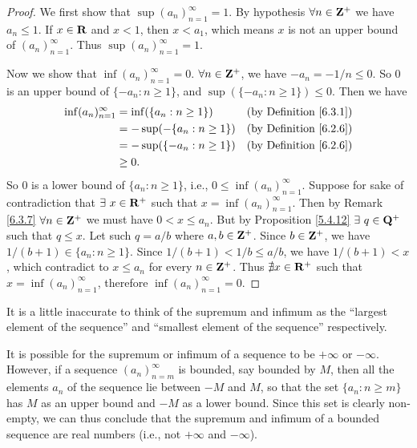 \begin{proof}
    We first show that \(\sup(a_n)_{n = 1}^\infty = 1\).
    By hypothesis \(\forall n \in \mathbf{Z}^+\) we have \(a_n \leq 1\).
    If \(x \in \mathbf{R}\) and \(x < 1\), then \(x < a_1\), which means \(x\) is not an upper bound of \((a_n)_{n = 1}^\infty\).
    Thus \(\sup(a_n)_{n = 1}^\infty = 1\).

    Now we show that \(\inf(a_n)_{n = 1}^\infty = 0\).
    \(\forall n \in \mathbf{Z}^+\), we have \(-a_n = -1 / n \leq 0\).
    So \(0\) is an upper bound of \(\{-a_n : n \geq 1\}\), and \(\sup(\{-a_n : n \geq 1\}) \leq 0\).
    Then we have
    \begin{align*}
        \inf(a_n)_{n = 1}^\infty & = \inf(\{a_n : n \geq 1\})   & \text{(by Definition \ref{6.3.1})} \\
                                 & = -\sup(-\{a_n : n \geq 1\}) & \text{(by Definition \ref{6.2.6})} \\
                                 & = -\sup(\{-a_n : n \geq 1\}) & \text{(by Definition \ref{6.2.6})} \\
                                 & \geq 0.
    \end{align*}
    So \(0\) is a lower bound of \(\{a_n : n \geq 1\}\), i.e., \(0 \leq \inf(a_n)_{n = 1}^\infty\).
    Suppose for sake of contradiction that \(\exists\ x \in \mathbf{R}^+\) such that \(x = \inf(a_n)_{n = 1}^\infty\).
    Then by Remark \ref{6.3.7} \(\forall n \in \mathbf{Z}^+\) we must have \(0 < x \leq a_n\).
    But by Proposition \ref{5.4.12} \(\exists\ q \in \Q^+\) such that \(q \leq x\).
    Let such \(q = a / b\) where \(a, b \in \mathbf{Z}^+\).
    Since \(b \in \mathbf{Z}^+\), we have \(1 / (b + 1) \in \{a_n : n \geq 1\}\).
    Since \(1 / (b + 1) < 1 / b \leq a / b\), we have \(1 / (b + 1) < x\), which contradict to \(x \leq a_n\) for every \(n \in \mathbf{Z}^+\).
    Thus \(\nexists x \in \mathbf{R}^+\) such that \(x = \inf(a_n)_{n = 1}^\infty\), therefore \(\inf(a_n)_{n = 1}^\infty = 0\).
\end{proof}

\begin{note}
    It is a little inaccurate to think of the supremum and infimum as the ``largest element of the sequence'' and ``smallest element of the sequence'' respectively.
\end{note}

\begin{note}
    It is possible for the supremum or infimum of a sequence to be \(+\infty\) or \(-\infty\).
    However, if a sequence \((a_n)_{n = m}^\infty\) is bounded, say bounded by \(M\), then all the elements \(a_n\) of the sequence lie between \(-M\) and \(M\), so that the set \(\{a_n : n \geq m\}\) has \(M\) as an upper bound and \(-M\) as a lower bound.
    Since this set is clearly non-empty, we can thus conclude that the supremum and infimum of a bounded sequence are real numbers (i.e., not \(+\infty\) and \(-\infty\)).
\end{note}

